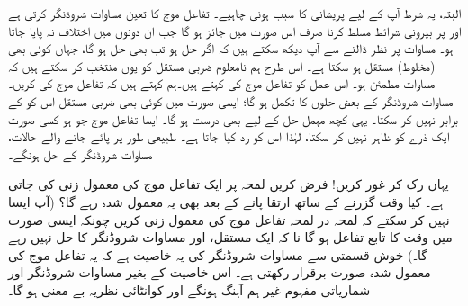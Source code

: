 البتہ،  یہ شرط آپ کے لیے  پریشانی کا سبب ہونی چاہیے۔   تفاعل موج کا تعین  مساوات شروڈنگر  کرتی ہے اور  پر بیرونی شرائط مسلط کرنا صرف اس صورت میں  جائز ہو گا جب ان دونوں میں  اختلاف نہ پایا جاتا ہو۔ مساوات  پر نظر ڈالنے سے آپ دیکھ سکتے ہیں کہ اگر   حل ہو تب  بھی حل ہو گا، جہاں  کوئی بھی (مخلوط) مستقل ہو سکتا ہے۔ اس طرح ہم   نامعلوم  ضربی مستقل کو یوں منتخب کر سکتے ہیں  کہ  مساوات   مطمئن ہو۔  اس عمل کو تفاعل موج کی  کہتے ہیں۔ہم کہتے ہیں کہ تفاعل موج کی  کریں۔ مساوات شروڈنگر کے بعض حلوں کا تکمل  ہو گا؛ ایسی صورت میں کوئی  بھی ضربی مستقل اس کو  کے برابر نہیں کر سکتا۔ یہی کچھ مہمل  حل  کے لیے بھی درست ہو گا۔ ایسا تفاعل موج جو      ہو  کسی صورت ایک ذرے کو ظاہر نہیں کر سکتا،  لہٰذا اس کو رد کیا جاتا ہے۔  طبیعی طور پر پائے جانے والے حالات، مساوات شروڈنگر کے    حل ہونگے۔

 یہاں رک کر  غور کریں!  فرض کریں لمحہ  پر  ایک تفاعل موج کی معمول زنی کی  جاتی ہے۔ کیا وقت گزرنے کے ساتھ  ارتقا پانے کے بعد بھی یہ معمول شدہ رہے گا؟ (آپ ایسا نہیں کر سکتے  کہ لمحہ در لمحہ  تفاعل موج کی معمول زنی کریں  چونکہ ایسی صورت میں  وقت  کا تابع تفاعل ہو گا نا کہ ایک مستقل، اور  مساوات شروڈنگر کا حل نہیں رہے گا۔) خوش قسمتی سے مساوات شروڈنگر کی یہ  خاصیت ہے کہ یہ تفاعل موج  کی معمول شدہ صورت برقرار رکھتی ہے۔ اس خاصیت کے بغیر مساوات شروڈنگر  اور شماریاتی مفہوم غیر ہم آہنگ ہونگے اور  کوانٹائی  نظریہ بے معنی ہو گا۔

